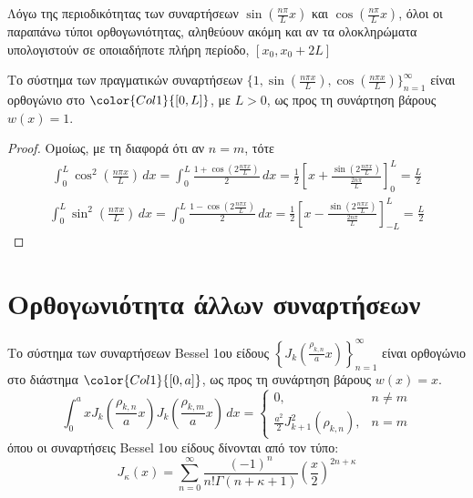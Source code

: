 \documentclass[a4paper,table]{report}
\begin{document}
\begin{rem}
  Λόγω της περιοδικότητας των συναρτήσεων $ \sin{(\frac{n \pi}{L} x)} $ και 
  $ \cos{( \frac{n \pi}{L} x)} $, όλοι οι παραπάνω τύποι ορθογωνιότητας, αληθεύουν ακόμη 
  και αν τα ολοκληρώματα υπολογιστούν σε οποιαδήποτε πλήρη περίοδο, 
  $ [x_{0}, x_{0}+ 2L] $  
\end{rem}

\begin{prop}
  Το σύστημα των πραγματικών συναρτήσεων 
  $ \{ 1, \sin{\left(\frac{n \pi x}{L}\right)}, 
  \cos{\left(\frac{n \pi x}{L}\right)} \}_{n=1}^{\infty} $ 
  είναι ορθογώνιο στο $ \color{Col1}{[0,L]} $, με $ L>0 $, ως προς τη συνάρτηση βάρους 
  $ w(x)=1 $.
\end{prop}
\begin{proof}
  Ομοίως, με τη διαφορά ότι αν $ n=m $, τότε 
  \begin{align*}
    \int _{0}^{L} \cos^{2}\left(\frac{n \pi x}{L}\right) \,{dx} = 
    \int _{0}^{L} \frac{1+ \cos{\left( 2 \frac{n \pi x}{L} \right)}}{2}
    \,{dx} = 
    \frac{1}{2} \left[x + \frac{\sin{\left(2 \frac{n \pi x}{L}\right)}}
    {\frac{2 n \pi}{L}} \right]_{0}^{L} = \frac{L}{2}
  \end{align*}
  \begin{align*}
    \int _{0}^{L} \sin^{2}\left(\frac{n \pi x}{L}\right) \,{dx} = 
    \int _{0}^{L} \frac{1- \cos{\left( 2 \frac{n \pi x}{L} \right)}}{2}
    \,{dx} = 
    \frac{1}{2} \left[x - \frac{\sin{\left(2 \frac{n \pi x}{L}\right)}}
    {\frac{2 n \pi}{L}} \right]_{-L}^{L} = \frac{L}{2}
  \end{align*}
\end{proof}

\section*{Ορθογωνιότητα άλλων συναρτήσεων}

\begin{prop}
  Το σύστημα των συναρτήσεων \textcolor{Col1}{Bessel 1ου είδους}
  $ \left\{ J_{k}\left(\frac{\rho _{k,n}}{a}x \right)\right\}_{n=1}^{\infty} $ 
  είναι ορθογώνιο στο διάστημα $ \color{Col1}{[0,a]} $, ως προς τη συνάρτηση βάρους 
  $ w(x)=x $.
  \[
    \int _{0}^{a} x J_{k}\left(\frac{\rho _{k,n}}{a}x \right)
    J_{k}\left(\frac{\rho_{k,m}}{a}x\right) \,{dx} = 
    \begin{cases}
      0, & n \neq m \\
      \frac{a^{2}}{2} J_{k+1}^{2}(\rho_{k,n}), & n=m
    \end{cases}
   \] 
  όπου οι συναρτήσεις Bessel 1ου είδους δίνονται από τον τύπο:
  \[
    J_{\kappa}(x) = \sum_{n=0}^{\infty} \frac{(-1)^{n}}{n!
    \Gamma(n+\kappa+1)}\left(\frac{x}{2}\right)^{2n+\kappa} 
  \]
\end{prop}
\end{document}
